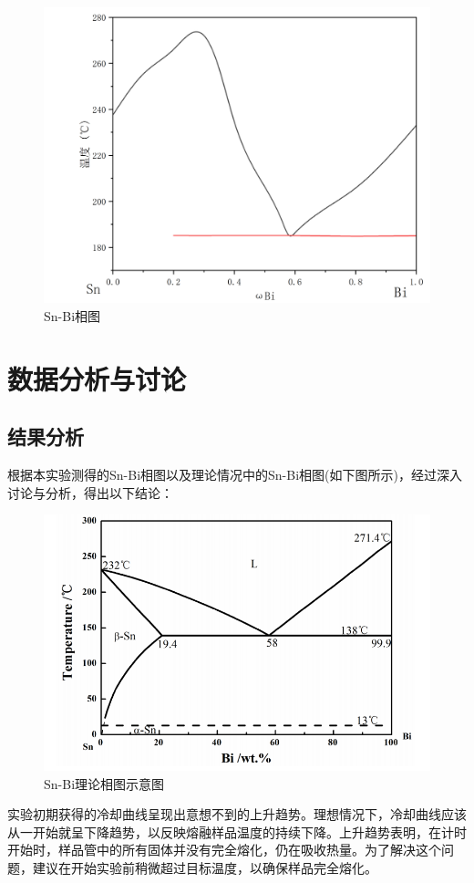 \documentclass[12pt,hyperref,a4paper,UTF8]{ctexart}
\begin{document}
\begin{figure}[H]
    \centering
    \includegraphics[width=0.7\linewidth]{WechatIMG636.jpg}
    \caption{Sn-Bi相图}
    \label{fig:enter-label8}
\end{figure}

\clearpage

\section{数据分析与讨论}
\subsection{结果分析}
根据本实验测得的Sn-Bi相图以及理论情况中的Sn-Bi相图\cite{1}(如下图所示)，经过深入讨论与分析，得出以下结论：
\begin{figure}[H]
    \centering
    \includegraphics[width=0.5\linewidth]{截屏2023-12-23 11.32.52.png}
    \caption{Sn-Bi理论相图示意图}
    \label{fig:enter-label12}
\end{figure}
实验初期获得的冷却曲线呈现出意想不到的上升趋势。理想情况下，冷却曲线应该从一开始就呈下降趋势，以反映熔融样品温度的持续下降。上升趋势表明，在计时开始时，样品管中的所有固体并没有完全熔化，仍在吸收热量。为了解决这个问题，建议在开始实验前稍微超过目标温度，以确保样品完全熔化。
\end{document}
